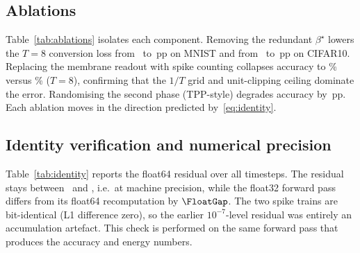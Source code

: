 \begin{table}[t]
\centering
\caption{Five-seed top-1 (\%) at $T{=}4$ and $T{=}8$ for all adapted conversion baselines. Chance is 10\%.}
\label{tab:baselines}

\end{table}

\subsection{Ablations}
\label{ssec:ablations}

Table~\ref{tab:ablations} isolates each component. Removing the redundant $\beta^\star$ lowers the $T{=}8$ conversion loss from \BetaLossVoneM\ to \BetaLossVtwoM\,pp on MNIST and from \BetaLossVoneC\ to \BetaLossVtwoC\,pp on CIFAR10. Replacing the membrane readout with spike counting collapses accuracy to \CountAcc\% versus \MembraneAcc\% ($T{=}8$), confirming that the $1/T$ grid and unit-clipping ceiling dominate the error. Randomising the second phase (TPP-style) degrades accuracy by \TPPGain\,pp. Each ablation moves in the direction predicted by~\eqref{eq:identity}.

\begin{table}[t]
\centering
\caption{Component ablations at $T{=}8$ (five seeds). Values are top-1 (\%) or conversion loss (pp).}
\label{tab:ablations}

\end{table}

\subsection{Identity verification and numerical precision}
\label{ssec:verify}

Table~\ref{tab:identity} reports the float64 residual over all timesteps. The residual stays between \IdentityMin\ and \IdentityMax, i.e.\ at machine precision, while the float32 forward pass differs from its float64 recomputation by $\FloatGap$. The two spike trains are bit-identical (L1 difference zero), so the earlier $10^{-7}$-level residual was entirely an accumulation artefact. This check is performed on the same forward pass that produces the accuracy and energy numbers.

\begin{table}[t]
\centering
\caption{Maximum $|(\Bh-B)-R A(E_1W_2)|$ in float64 across timesteps and holdout seeds.}
\label{tab:identity}

\end{table}

